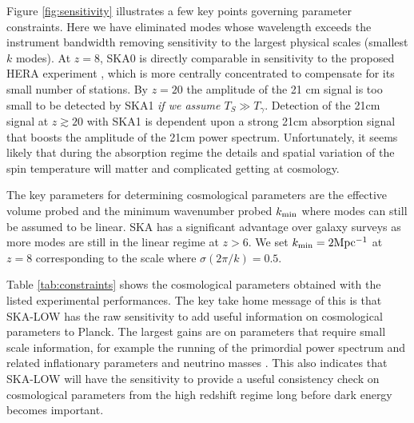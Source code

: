 \documentclass{PoS}
\begin{document}
Figure \ref{fig:sensitivity} illustrates a few key points governing parameter constraints. Here we have eliminated modes whose wavelength exceeds the instrument bandwidth removing sensitivity to the largest physical scales (smallest $k$ modes). At $z=8$, SKA0 is directly comparable in sensitivity to the proposed HERA experiment \cite{2014ApJ...782...66P}, which is more centrally concentrated to compensate for its small number of stations. By $z=20$ the amplitude of the 21 cm signal is too small to be detected by SKA1 {\em if we assume $T_S\gg T_\gamma$}. Detection of the 21cm signal at $z\gtrsim20$ with SKA1 is dependent upon a strong 21cm absorption signal that boosts the amplitude of the 21cm power spectrum. Unfortunately, it seems likely that during the absorption regime the details and spatial variation of the spin temperature will matter and complicated getting at cosmology.

The key parameters for determining cosmological parameters are the effective volume probed and the minimum wavenumber probed $k_{\rm min}$ where modes can still be assumed to be linear. SKA has a significant advantage over galaxy surveys as more modes are still in the linear regime at $z>6$. We set $k_{\rm min}=2{\rm Mpc^{-1}}$ at $z=8$ corresponding to the scale where $\sigma(2\pi/k)=0.5$.

Table \ref{tab:constraints} shows the cosmological parameters obtained with the listed experimental performances. The key take home message of this is that SKA-LOW has the raw sensitivity to add useful information on cosmological parameters to Planck. The largest gains are on parameters that require small scale information, for example the running of the primordial power spectrum and related inflationary parameters \citep{2009PhLB..673..173B,2011JCAP...02..021A} and neutrino masses \citep{2008PhRvD..78f5009P}. This also indicates that SKA-LOW will have the sensitivity to provide a useful consistency check on cosmological parameters from the high redshift regime long before dark energy becomes important.
\end{document}
